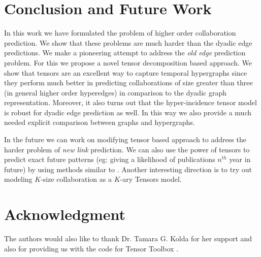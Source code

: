 \documentclass[twoside,leqno,twocolumn]{article}
\begin{document}
\section{Conclusion and  Future Work}

In this work we have formulated the problem of higher order collaboration prediction. We show that these problems are much harder than the dyadic edge predictions. We make a pioneering attempt to address the \textit{old edge} prediction problem. For this we propose a novel tensor decomposition based approach. We show that tensors are an excellent way to capture temporal hypergraphs since they perform much better in predicting collaborations of size greater than three (in general higher order hyperedges) in comparison to the dyadic graph representation. Moreover, it also turns out that the hyper-incidence tensor model is robust for dyadic edge prediction as well. In this way we also provide a much needed explicit comparison between graphs and hypergraphs. 

In the future we can work on modifying tensor based approach to address the harder problem of \textit{new link} prediction. We can also use the power of tensors to predict exact future patterns (eg: giving a likelihood of publications $n^{th}$ year in future) by using methods similar to \cite{kolda11}. Another interesting direction is to try out modeling $K$-size collaboration as a $K$-ary Tensors model. 


\section*{Acknowledgment}

The authors would also like to thank Dr. Tamara G. Kolda for her support and also for providing us with the code for Tensor Toolbox \cite{kolda07}. 
\end{document}
